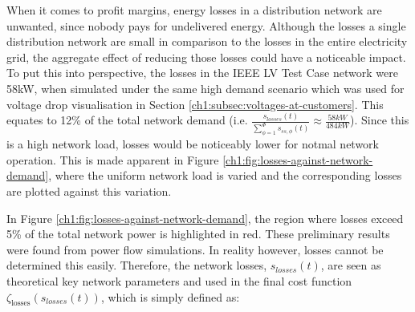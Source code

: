 When it comes to profit margins, energy losses in a distribution network are unwanted, since nobody pays for undelivered energy.
Although the losses a single distribution network are small in comparison to the losses in the entire electricity grid, the aggregate effect of reducing those losses could have a noticeable impact.
To put this into perspective, the losses in the IEEE LV Test Case network were 58kW, when simulated under the same high demand scenario which was used for voltage drop visualisation in Section \ref{ch1:subsec:voltages-at-customers}.
This equates to 12\% of the total network demand ($\text{i.e. }\frac{s_{losses}(t)}{\sum_{\phi=1}^\Phi{s_{ss,\phi}(t)}} \approx \frac{58kW}{484kW}$).
Since this is a high network load, losses would be noticeably lower for notmal network operation.
This is made apparent in Figure \ref{ch1:fig:losses-against-network-demand}, where the uniform network load is varied and the corresponding losses are plotted against this variation.



In Figure \ref{ch1:fig:losses-against-network-demand}, the region where losses exceed 5\% of the total network power is highlighted in red.
These preliminary results were found from power flow simulations.
In reality however, losses cannot be determined this easily.
Therefore, the network losses, $s_{losses}(t)$, are seen as theoretical key network parameters and used in the final cost function $\zeta_\text{losses}(s_{losses}(t))$, which is simply defined as:



